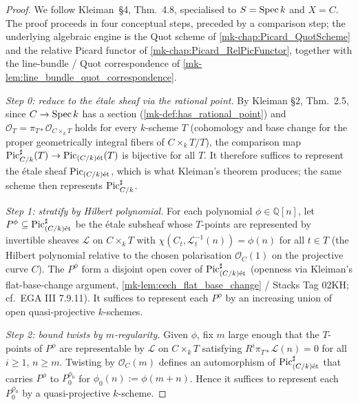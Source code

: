 \begin{proof}

  We follow Kleiman~\S 4, Thm.~4.8, specialised to \(S = \operatorname{Spec} k\) and
  \(X = C\). The proof proceeds in four conceptual steps, preceded by a
  comparison step; the underlying algebraic engine is the Quot scheme of
  \ref{mk-chap:Picard_QuotScheme} and the relative Picard functor of
  \ref{mk-chap:Picard_RelPicFunctor}, together with the line-bundle / Quot
  correspondence of \ref{mk-lem:line_bundle_quot_correspondence}.

  \emph{Step 0: reduce to the \'etale sheaf via the rational point.}
  By Kleiman \S 2, Thm.~2.5, since \(C \to \operatorname{Spec} k\) has a section
  (\ref{mk-def:has_rational_point}) and \(\mathcal O_T = \pi_{T*}
  \mathcal O_{C \times_k T}\) holds for every \(k\)-scheme \(T\) (cohomology
  and base change for the proper geometrically integral fibers of
  \(C\times_k T/T\)), the comparison map
  \(\operatorname{Pic}^\sharp_{C/k}(T) \to \operatorname{Pic}_{(C/k)\mathrm{\acute{e}t}}(T)\) is bijective for all
  \(T\). It therefore suffices to represent the \'etale sheaf
  \(\operatorname{Pic}_{(C/k)\mathrm{\acute{e}t}}\), which is what Kleiman's theorem produces; the same
  scheme then represents \(\operatorname{Pic}^\sharp_{C/k}\).

  \emph{Step 1: stratify by Hilbert polynomial.}
  For each polynomial \(\phi \in \mathbb{Q}[n]\), let \(P^\phi \subseteq
  \operatorname{Pic}^\sharp_{(C/k)\mathrm{\acute{e}t}}\) be the \'etale subsheaf whose \(T\)-points are
  represented by invertible sheaves \(\mathcal{L}\) on \(C \times_k T\) with
  \(\chi(C_t, \mathcal{L}_t^{-1}(n)) = \phi(n)\) for all \(t \in T\) (the
  Hilbert polynomial relative to the chosen polarisation
  \(\mathcal{O}_C(1)\) on the projective curve \(C\)). The \(P^\phi\) form a
  disjoint open cover of \(\operatorname{Pic}^\sharp_{(C/k)\mathrm{\acute{e}t}}\) (openness via Kleiman's
  flat-base-change argument, \ref{mk-lem:cech_flat_base_change} / Stacks Tag 02KH;
  cf.\ EGA III 7.9.11). It suffices to
  represent each \(P^\phi\) by an increasing union of open quasi-projective
  \(k\)-schemes.

  \emph{Step 2: bound twists by \(m\)-regularity.}
  Given \(\phi\), fix \(m\) large enough that the \(T\)-points of \(P^\phi\) are
  representable by \(\mathcal{L}\) on \(C \times_k T\) satisfying
  \(R^i \pi_{T*} \mathcal{L}(n) = 0\) for all \(i \ge 1\), \(n \ge m\). Twisting
  by \(\mathcal{O}_C(m)\) defines an automorphism of \(\operatorname{Pic}^\sharp_{(C/k)\mathrm{\acute{e}t}}\)
  that carries \(P^\phi\) to \(P^{\phi_0}_0\) for \(\phi_0(n) := \phi(m + n)\).
  Hence it suffices to represent each \(P^{\phi_0}_0\) by a quasi-projective
  \(k\)-scheme.


\end{proof}
